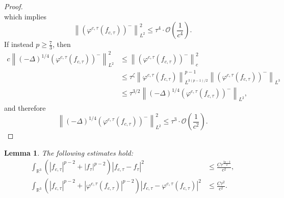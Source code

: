 \documentclass{amsart}
\theoremstyle{plain}
\newtheorem{lemma}[theorem]{Lemma}
\theoremstyle{definition}
\theoremstyle{remark}
\numberwithin{equation}{section} \numberwithin{figure}{section}
\begin{document}
\begin{proof}
\begin{equation*}
    \end{equation*}
    which implies
    \[
    \left\|\left(\varphi^{c,\tau}(f_{c, \tau})\right)^-\right\|_{L^2}^2 \leq \tau^4 \cdot \mathcal{O}\left(\frac{1}{c^4}\right).
    \] 
    If instead $p \geq \frac{7}{3}$, then
    \begin{equation*}
    \begin{aligned}
    c \left\|(-\Delta)^{1/4}\left(\varphi^{c,\tau}(f_{c, \tau})\right)^-\right\|_{L^2}^2 
    &\leq \left\|\left(\varphi^{c,\tau}(f_{c, \tau})\right)^-\right\|_c^2 \\
    &\leq \tau^{\zeta} \left\|\varphi^{c,\tau}(f_{c, \tau})\right\|_{L^{3(p-1)/2}}^{p-1} \left\|\left(\varphi^{c,\tau}(f_{c, \tau})\right)^-\right\|_{L^3} \\
    &\leq \tau^{3/2} \left\|(-\Delta)^{1/4}\left(\varphi^{c,\tau}(f_{c, \tau})\right)^-\right\|_{L^2},
    \end{aligned}
    \end{equation*}
    and therefore
    \[
    \left\|(-\Delta)^{1/4}\left(\varphi^{c,\tau}(f_{c, \tau})\right)^-\right\|_{L^2}^2 \leq \tau^3 \cdot \mathcal{O}\left(\frac{1}{c^2}\right).
    \]
    \end{proof}
    
   


    \begin{lemma}\label{stb_7}
      The following estimates hold:
      \begin{align}
      \int_{\mathbb{R}^3} \left(|f_{c,\tau}|^{p-2} + |f_{\tau}|^{p-2} \right) \left| f_{c,\tau} - f_\tau \right|^2 &\leq \frac{C \tau^{\frac{3p-2}{2}}}{c^2}, \label{stb_5} \\
      \int_{\mathbb{R}^3} \left(|f_{c,\tau}|^{p-2} + |\varphi^{c,\tau}(f_{c, \tau})|^{p-2} \right) \left| f_{c,\tau} - \varphi^{c,\tau}(f_{c, \tau}) \right|^2 &\leq \frac{C \tau^{2}}{c^2}. \label{stb_6}
      \end{align}
      \end{lemma}
      
\end{document}
